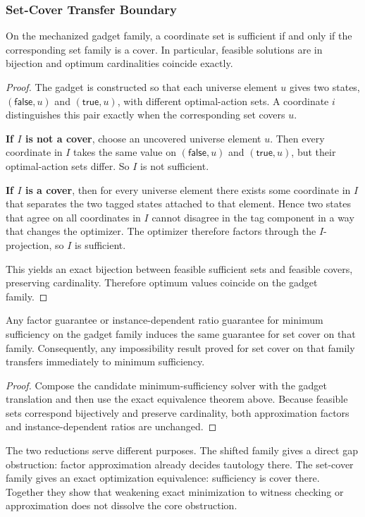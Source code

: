 \subsubsection{Set-Cover Transfer Boundary}

\begin{theorem}
On the mechanized gadget family, a coordinate set is sufficient if and only if the corresponding set family is a cover. In particular, feasible solutions are in bijection and optimum cardinalities coincide exactly.
\end{theorem}


\begin{proof}
The gadget is constructed so that each universe element $u$ gives two states, $(\mathsf{false},u)$ and $(\mathsf{true},u)$, with different optimal-action sets. A coordinate $i$ distinguishes this pair exactly when the corresponding set covers $u$.

\textbf{If $I$ is not a cover}, choose an uncovered universe element $u$. Then every coordinate in $I$ takes the same value on $(\mathsf{false},u)$ and $(\mathsf{true},u)$, but their optimal-action sets differ. So $I$ is not sufficient.

\textbf{If $I$ is a cover}, then for every universe element there exists some coordinate in $I$ that separates the two tagged states attached to that element. Hence two states that agree on all coordinates in $I$ cannot disagree in the tag component in a way that changes the optimizer. The optimizer therefore factors through the $I$-projection, so $I$ is sufficient.

This yields an exact bijection between feasible sufficient sets and feasible covers, preserving cardinality. Therefore optimum values coincide on the gadget family.
\end{proof}

\begin{corollary}
Any factor guarantee or instance-dependent ratio guarantee for minimum sufficiency on the gadget family induces the same guarantee for set cover on that family. Consequently, any impossibility result proved for set cover on that family transfers immediately to minimum sufficiency.
\end{corollary}


\begin{proof}
Compose the candidate minimum-sufficiency solver with the gadget translation and then use the exact equivalence theorem above. Because feasible sets correspond bijectively and preserve cardinality, both approximation factors and instance-dependent ratios are unchanged.
\end{proof}

The two reductions serve different purposes. The shifted family gives a direct gap obstruction: factor approximation already decides tautology there. The set-cover family gives an exact optimization equivalence: sufficiency is cover there. Together they show that weakening exact minimization to witness checking or approximation does not dissolve the core obstruction.
